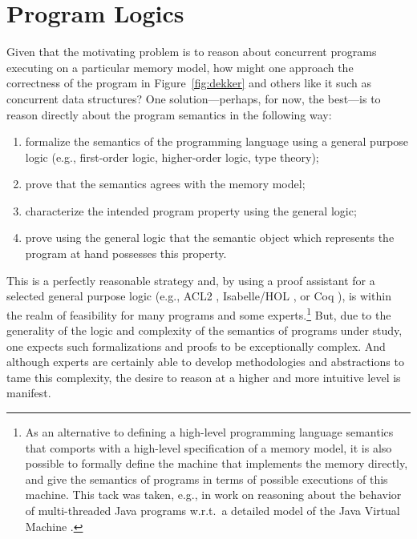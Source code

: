\documentclass[11pt]{report}         %
\begin{document}
\section{Program Logics}
\label{sec:program-logics}

Given that the motivating problem is to reason about concurrent programs executing on a particular memory model, how might one approach the correctness of the program in Figure~\ref{fig:dekker} and others like it such as concurrent data structures? One solution---perhaps, for now, the best---is to reason directly about the program semantics in the following way:
\begin{enumerate}
\item formalize the semantics of the programming language using a general purpose logic (e.g., first-order logic, higher-order logic, type theory);

\item prove that the semantics agrees with the memory model;

\item characterize the intended program property using the general logic; 

\item prove using the general logic that the semantic object which represents the program at hand possesses this property.
\end{enumerate} 
This is a perfectly reasonable strategy and, by using a proof assistant for a selected general purpose logic (e.g., ACL2 \cite{DBLP:journals/tse/KaufmannM97}, Isabelle/HOL \cite{DBLP:books/sp/NipkowPW02}, or Coq \cite{CoqBook}), is within the realm of feasibility for many programs and some experts.\footnote{As an alternative to defining a high-level programming language semantics that comports with a high-level specification of a memory model, it is also possible to formally define the machine that implements the memory directly, and give the semantics of programs in terms of possible executions of this machine. This tack was taken, e.g., in work on reasoning about the behavior of multi-threaded Java programs w.r.t.\ a detailed model of the Java Virtual Machine \cite{DBLP:conf/jvm/MooreP01}.} But, due to the generality of the logic and complexity of the semantics of programs under study, one expects such formalizations and proofs to be exceptionally complex. And although experts are certainly able to develop methodologies and abstractions to tame this complexity, the desire to reason at a higher and more intuitive level is manifest.
\end{document}
